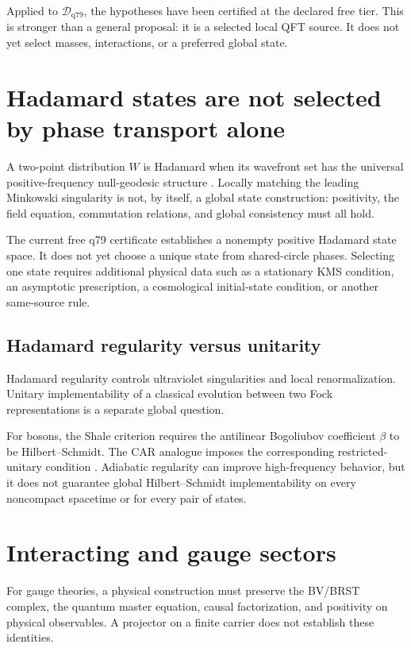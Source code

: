 \documentclass[11pt]{article}
\theoremstyle{definition}
\theoremstyle{remark}
\newcommand{\D}{\mathcal D}
\begin{document}
Applied to \(\D_{\mathrm{q79}}\), the hypotheses have been certified at the
declared free tier. This is stronger than a general proposal: it is a
selected local QFT source. It does not yet select masses, interactions, or a
preferred global state.

\section{Hadamard states are not selected by phase transport alone}

A two-point distribution \(W\) is Hadamard when its wavefront set has the
universal positive-frequency null-geodesic structure
\cite{Radzikowski}. Locally matching the leading Minkowski singularity is
not, by itself, a global state construction: positivity, the field equation,
commutation relations, and global consistency must all hold.

The current free q79 certificate establishes a nonempty positive Hadamard
state space. It does not yet choose a unique state from shared-circle phases.
Selecting one state requires additional physical data such as a stationary
KMS condition, an asymptotic prescription, a cosmological initial-state
condition, or another same-source rule.

\subsection{Hadamard regularity versus unitarity}

Hadamard regularity controls ultraviolet singularities and local
renormalization. Unitary implementability of a classical evolution between
two Fock representations is a separate global question.

For bosons, the Shale criterion requires the antilinear Bogoliubov
coefficient \(\beta\) to be Hilbert--Schmidt. The CAR analogue imposes the
corresponding restricted-unitary condition \cite{Shale}. Adiabatic
regularity can improve high-frequency behavior, but it does not guarantee
global Hilbert--Schmidt implementability on every noncompact spacetime or
for every pair of states.

\section{Interacting and gauge sectors}

For gauge theories, a physical construction must preserve the BV/BRST
complex, the quantum master equation, causal factorization, and positivity
on physical observables. A projector on a finite carrier does not establish
these identities.
\end{document}
